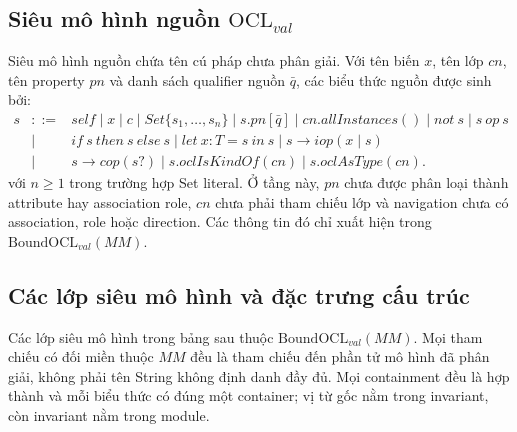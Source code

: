 \documentclass[11pt,a4paper]{article}
\theoremstyle{definition}
\newcommand{\OCLval}{\mathrm{OCL}_{val}}
\newcommand{\BoundOCLval}{\mathrm{BoundOCL}_{val}}
\begin{document}
\subsection{Siêu mô hình nguồn $\OCLval$}

Siêu mô hình nguồn chứa tên cú pháp chưa phân giải. Với tên biến $x$, tên lớp
$cn$, tên property $pn$ và danh sách qualifier nguồn $\bar q$, các biểu thức
nguồn được sinh bởi:
\[
\begin{array}{rcl}
s &::=& self \mid x \mid c \mid Set\{s_1,\ldots,s_n\} \mid s.pn[\bar q]
 \mid cn.allInstances() \mid not\ s \mid s\ op\ s\\
&\mid& if\ s\ then\ s\ else\ s
 \mid let\ x:T=s\ in\ s
 \mid s\to iop(x\mid s)\\
&\mid& s\to cop(s?)
 \mid s.oclIsKindOf(cn)
 \mid s.oclAsType(cn).
\end{array}
\]
với $n\geq 1$ trong trường hợp Set literal.
Ở tầng này, $pn$ chưa được phân loại thành attribute hay association role,
$cn$ chưa phải tham chiếu lớp và navigation chưa có association, role hoặc
direction. Các thông tin đó chỉ xuất hiện trong $\BoundOCLval(MM)$.

\subsection{Các lớp siêu mô hình và đặc trưng cấu trúc}

Các lớp siêu mô hình trong bảng sau thuộc $\BoundOCLval(MM)$. Mọi tham chiếu có
đối miền thuộc $MM$ đều là tham chiếu đến phần tử mô hình đã
phân giải, không phải tên String không định danh đầy đủ. Mọi containment đều là
hợp thành và mỗi biểu thức có đúng một container; vị từ gốc nằm trong invariant,
còn invariant nằm trong module.
\end{document}
